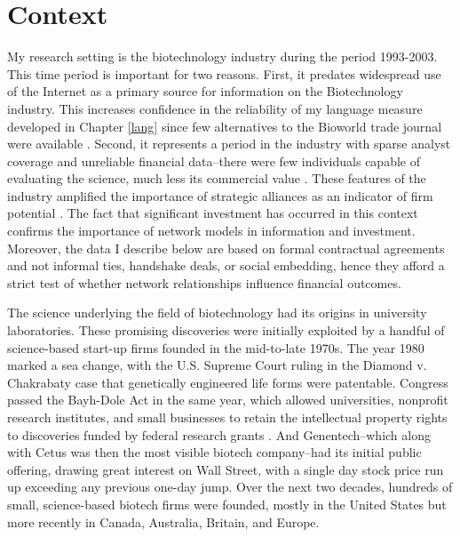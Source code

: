 \section{Context}

My research setting is the biotechnology industry during the period 1993-2003. This time period is important for two reasons. First, it predates widespread use of the Internet as a primary source for information on the Biotechnology industry. This increases confidence in the reliability of my language measure developed in Chapter \ref{lang} since few alternatives to the Bioworld trade journal were available \citep{wolff2001}. Second, it represents a period in the industry with sparse analyst coverage and unreliable financial data--there were few individuals capable of evaluating the science, much less its commercial value \citep{powell2005, wolff2001}. These features of the industry amplified the importance of strategic alliances as an indicator of firm potential \citep{podolny2001, shane2002}. The fact that significant investment has occurred in this context confirms the importance of network models in information and investment. Moreover, the data I describe below are based on formal contractual agreements and not informal ties, handshake deals, or social embedding, hence they afford a strict test of whether network relationships influence financial outcomes.  

The science underlying the field of biotechnology had its origins in university laboratories. These promising discoveries were initially exploited by a handful of science-based start-up firms founded in the mid-to-late 1970s. The year 1980 marked a sea change, with the U.S. Supreme Court ruling in the Diamond v. Chakrabaty case that genetically engineered life forms were patentable. Congress passed the Bayh-Dole Act in the same year, which allowed universities, nonprofit research institutes, and small businesses to retain the intellectual property rights to discoveries funded by federal research grants \citep{mowery2001}. And Genentech--which along with Cetus was then the most visible biotech company--had its initial public offering, drawing great interest on Wall Street, with a single day stock price run up exceeding any previous one-day jump. Over the next two decades, hundreds of small, science-based biotech firms were founded, mostly in the United States but more recently in Canada, Australia, Britain, and Europe.

